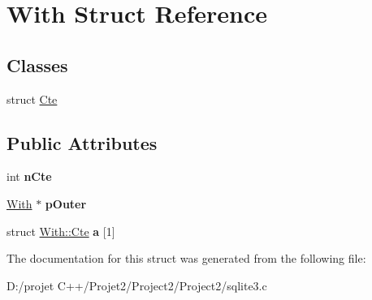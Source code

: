 \hypertarget{struct_with}{}\section{With Struct Reference}
\label{struct_with}
\subsection*{Classes}
\begin{DoxyCompactItemize}
\item 
struct \mbox{\hyperlink{struct_with_1_1_cte}{Cte}}
\end{DoxyCompactItemize}
\subsection*{Public Attributes}
\begin{DoxyCompactItemize}
\item 
\mbox{\label{struct_with_a42f5ecda008d1671bb317b8219f5a6ed}} 
int {\bfseries n\+Cte}
\item 
\mbox{\label{struct_with_ab86b3af65b4e3d4c0b1ee04ffa50e1d9}} 
\mbox{\hyperlink{struct_with}{With}} $\ast$ {\bfseries p\+Outer}
\item 
\mbox{\label{struct_with_a9c68a725bc482cbcc65132a4b7b8aaf2}} 
struct \mbox{\hyperlink{struct_with_1_1_cte}{With\+::\+Cte}} {\bfseries a} \mbox{[}1\mbox{]}
\end{DoxyCompactItemize}


The documentation for this struct was generated from the following file\+:\begin{DoxyCompactItemize}
\item 
D\+:/projet C++/\+Projet2/\+Project2/\+Project2/sqlite3.\+c\end{DoxyCompactItemize}
